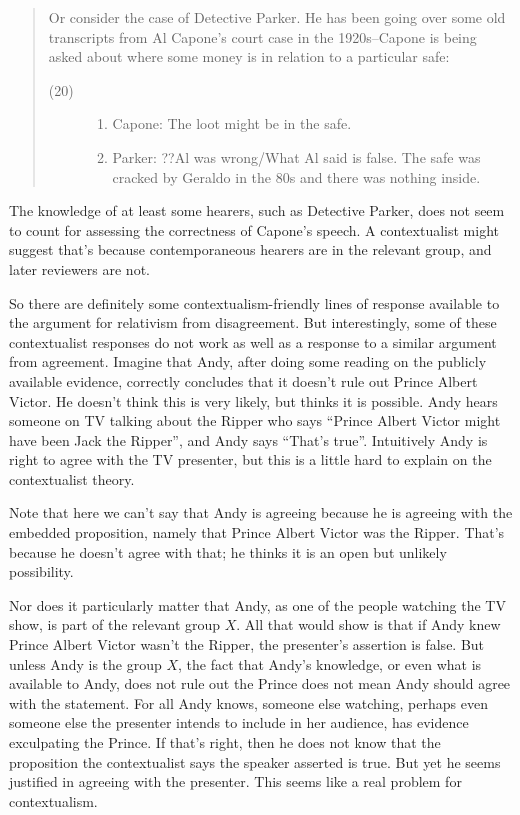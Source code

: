 \begin{quote}
Or consider the case of Detective Parker. He has been going over some old transcripts from Al Capone's court case in the 1920s--Capone is being asked about where some money is in relation to a particular safe: 

\begin{description}
\item[(20)]
\begin{enumerate}
\renewcommand{\labelenumi}{\alph{enumi}.}	
\item Capone: The loot might be in the safe. 
\item Parker: ??Al was wrong/What Al said is false. The safe was cracked by Geraldo in the 80s and there was nothing inside. \citeyearpar[86]{vonFintel2008}
\end{enumerate}
\end{description}
\end{quote}


The knowledge of at least some hearers, such as Detective Parker, does not seem to count for assessing the correctness of Capone's speech. A contextualist might suggest that's because contemporaneous hearers are in the relevant group, and later reviewers are not.

So there are definitely some contextualism-friendly lines of response available to the argument for relativism from disagreement. But interestingly, some of these contextualist responses do not work as well as a response to a similar argument from agreement. Imagine that Andy, after doing some reading on the publicly available evidence, correctly concludes that it doesn't rule out Prince Albert Victor. He doesn't think this is very likely, but thinks it is possible. Andy hears someone on TV talking about the Ripper who says ``Prince Albert Victor might have been Jack the Ripper'', and Andy says ``That's true''. Intuitively Andy is right to agree with the TV presenter, but this is a little hard to explain on the contextualist theory.

Note that here we can't say that Andy is agreeing because he is agreeing with the embedded proposition, namely that Prince Albert Victor was the Ripper. That's because he doesn't agree with that; he thinks it is an open but unlikely possibility.

Nor does it particularly matter that Andy, as one of the people watching the TV show, is part of the relevant group $X$. All that would show is that if Andy knew Prince Albert Victor wasn't the Ripper, the presenter's assertion is false. But unless Andy is the group $X$, the fact that Andy's knowledge, or even what is available to Andy, does not rule out the Prince does not mean Andy should agree with the statement. For all Andy knows, someone else watching, perhaps even someone else the presenter intends to include in her audience, has evidence exculpating the Prince. If that's right, then he does not know that the proposition the contextualist says the speaker asserted is true. But yet he seems justified in agreeing with the presenter. This seems like a real problem for contextualism.

